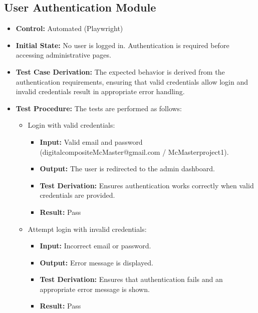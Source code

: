 \documentclass[12pt, titlepage]{article}
\begin{document}
\subsection{User Authentication Module}
\begin{itemize}
    \item \textbf{Control: }Automated (Playwright)
    \item \textbf{Initial State: }No user is logged in. Authentication is required before accessing administrative pages.
    \item \textbf{Test Case Derivation: }The expected behavior is derived from the authentication requirements, ensuring that valid credentials allow login and invalid credentials result in appropriate error handling.
    \item \textbf{Test Procedure: }The tests are performed as follows:
    \begin{itemize}
        \item Login with valid credentials:
        \begin{itemize}
            \item \textbf{Input: }Valid email and password (digitalcompositeMcMaster@gmail.com / McMasterproject1).
            \item \textbf{Output: }The user is redirected to the admin dashboard.
            \item \textbf{Test Derivation: }Ensures authentication works correctly when valid credentials are provided.
            \item \textbf{Result: }Pass
        \end{itemize}
        \item Attempt login with invalid credentials:
        \begin{itemize}
            \item \textbf{Input: }Incorrect email or password.
            \item \textbf{Output: }Error message is displayed.
            \item \textbf{Test Derivation: }Ensures that authentication fails and an appropriate error message is shown.
            \item \textbf{Result: }Pass
        \end{itemize}
    \end{itemize}
\end{itemize}
\end{document}
